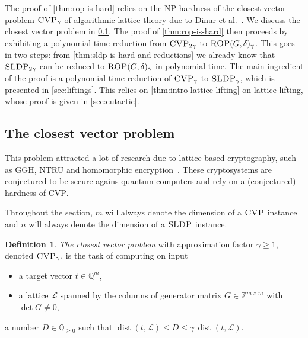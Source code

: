 \documentclass[10pt,a4paper]{article}
\theoremstyle{definition}
\newtheorem{definition}[theorem]{Definition}
\DeclareMathOperator{\dist}{dist}
\newcommand{\QQ}{\mathbb{Q}}
\newcommand{\ZZ}{\mathbb{Z}}
\numberwithin{equation}{section}
\begin{document}
The proof of \cref{thm:rop-is-hard} relies on the \textsc{NP}-hardness of
the closest vector problem $\textsc{CVP}_\gamma$
of algorithmic lattice theory due to Dinur et al.~\cite{dinurcvp}.
We discuss the closest vector problem in \cref{sec:sldp-to-cvp}.
The proof of \cref{thm:rop-is-hard} then proceeds by
exhibiting a polynomial time reduction from
$\textsc{CVP}_{2\gamma}$ to $\textsc{ROP}(G,\delta)_{\gamma}$.
This goes in two steps: from \cref{thm:sldp-is-hard-and-reductions}
we already know that
$\textsc{SLDP}_{2\gamma}$ can be reduced to $\textsc{ROP}(G,\delta)_\gamma$
in polynomial time.
The main ingredient of the proof is a polynomial time reduction of
$\textsc{CVP}_\gamma$ to $\textsc{SLDP}_\gamma$,
which is presented in \cref{sec:liftings}.
This relies on \cref{thm:intro lattice lifting}
on lattice lifting, whose proof is given in \cref{sec:eutactic}.


\subsection{The closest vector problem}\label{sec:sldp-to-cvp}
This problem attracted a lot of research due to lattice based cryptography, such as GGH, NTRU and
homomorphic encryption~\cite{ggh-crypto, ntru-crytpo-1, ntru-crypto-2, homomorphic-crypto}.
These cryptosystems are conjectured to be secure agains quantum computers and rely on a (conjectured) hardness of \textsc{CVP}.

Throughout the section, $m$ will always denote the dimension of a $\textsc{CVP}$ instance and $n$ will always denote the dimension of a $\textsc{SLDP}$ instance.

\begin{definition}
\label{def:gapcvp}
{\em The closest vector problem} with approximation factor $\gamma\geq1$,
denoted $\textsc{CVP}_\gamma$,
is the task of computing on input
\begin{itemize}
\item a target vector $t\in\QQ^m$,
\item a lattice $\mathcal{L}$ spanned by the columns of generator matrix $G\in\ZZ^{m\times m}$
 with $\det G\neq 0$,
\end{itemize}
a number $D\in\QQ_{\geq 0}$
such that
$\dist(t,\mathcal{L}) \leq  D \leq \gamma \, \dist( t , \mathcal{L} )$.
\end{definition}
\end{document}
